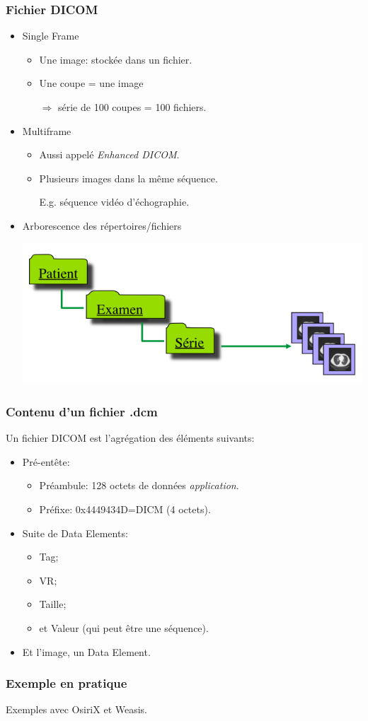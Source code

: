 \frame
{
	\frametitle{Fichier DICOM}
	\begin{itemize}
		\item Single Frame
		\begin{itemize}
			\item Une image: stock\'ee dans un fichier.
			\item Une coupe = une image
		
			$\Rightarrow$ s\'erie de 100 coupes = 100 fichiers.
		\end{itemize}
		\item<2-> Multiframe
		\begin{itemize}
			\item Aussi appel\'e \emph{Enhanced DICOM}.
			\item Plusieurs images dans la m\^eme s\'equence.
			
			E.g. s\'equence vid\'eo d'\'echographie.
		\end{itemize}
		\item<3-> Arborescence des r\'epertoires/fichiers
		\begin{center}
			\includegraphics[width=.8\linewidth]{../figures/arborescence.png}
		\end{center}

	\end{itemize}
}

\frame
{
	\frametitle{Contenu d'un fichier {.dcm}}
	
	Un fichier DICOM est l'agr\'egation des \'el\'ements suivants:
	\begin{itemize}
		\item<2-> Pr\'e-ent\^ete:
		\begin{itemize}
			\item<2-> Pr\'eambule: 128 octets de donn\'ees \emph{application}.
			\item<2-> Pr\'efixe: 0x4449434D=DICM (4 octets).
		\end{itemize}
		\item<3-> Suite de Data Elements:
		\begin{itemize}
			\item<4-> Tag;
			\item<5-> VR;
			\item<6-> Taille;
			\item<7-> et Valeur (qui peut \^etre une s\'equence).
		\end{itemize}
		\item<8-> Et l'image, un Data Element.
	\end{itemize}
}


\frame
{
	\frametitle{Exemple en pratique}
	Exemples avec OsiriX et Weasis.
}
